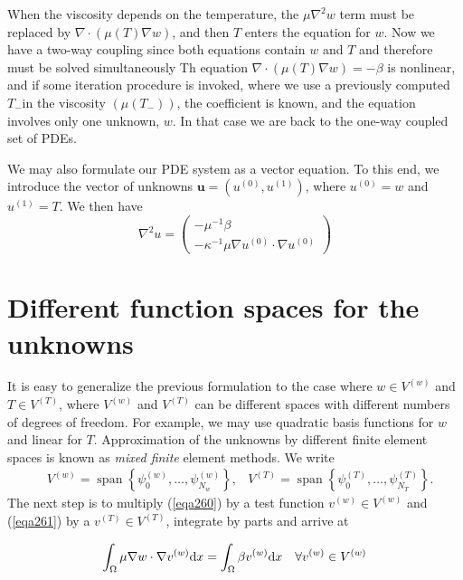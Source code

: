 \documentclass[../main.tex]{subfiles}
\begin{document}
		When the viscosity depends on the temperature, the $\mu \nabla^{2} w$ term must be replaced by $\nabla \cdot(\mu(T) \nabla w)$, and then $T$ enters the equation for $w$. Now we have a two-way coupling since both equations contain $w$ and $T$ and therefore must be solved simultaneously Th equation $\nabla \cdot(\mu(T) \nabla w)=-\beta$ is nonlinear, and if some iteration procedure is invoked, where we use a previously computed $T_{-}$in the viscosity $\left(\mu\left(T_{-}\right)\right)$, the coefficient is known, and the equation involves only one unknown, $w$. In that case we are back to the one-way coupled set of PDEs.
		
		We may also formulate our PDE system as a vector equation. To this end, we introduce the vector of unknowns $\boldsymbol{u}=\left(u^{(0)}, u^{(1)}\right)$, where $u^{(0)}=w$ and $u^{(1)}=T$. We then have
		$$
		\nabla^{2} u=\left(\begin{array}{c}
			-\mu^{-1} \beta \\
			-\kappa^{-1} \mu \nabla u^{(0)} \cdot \nabla u^{(0)}
		\end{array}\right)
		$$
	\section[Different function spaces for the unknowns]{Different function spaces for the unknowns}
		\label{sec:sec_20_4}
		\noindent It is easy to generalize the previous formulation to the case where $w \in V^{(w)}$ and $T \in V^{(T)}$, where $V^{(w)}$ and $V^{(T)}$ can be different spaces with different numbers of degrees of freedom. For example, we may use quadratic basis functions for $w$ and linear for $T$. Approximation of the unknowns by different finite element spaces is known as \emph{mixed finite} element methods.\smallbreak
		We write
		$$
		\begin{aligned}
			&V^{(w)}=\operatorname{span}\left\{\psi_{0}^{(w)}, \ldots, \psi_{N_{w}}^{(w)}\right\}, 
			&V^{(T)}=\operatorname{span}\left\{\psi_{0}^{(T)}, \ldots, \psi_{N_{T}}^{(T)}\right\} .
		\end{aligned}
		$$
		The next step is to multiply (\ref{eqa260}) by a test function $v^{(w)} \in V^{(w)}$ and (\ref{eqa261}) by a $v^{(T)} \in V^{(T)}$, integrate by parts and arrive at
		
		
		\begin{equation}
			\label{eqa288}
			\int_{\Omega} \mu \nabla w \cdot \nabla v^{(w)} \mathrm{d} x=\int_{\Omega} \beta v^{(w)} \mathrm{d} x \quad \forall v^{(w)} \in V^{(w)} \\
		\end{equation}
	
\end{document}
